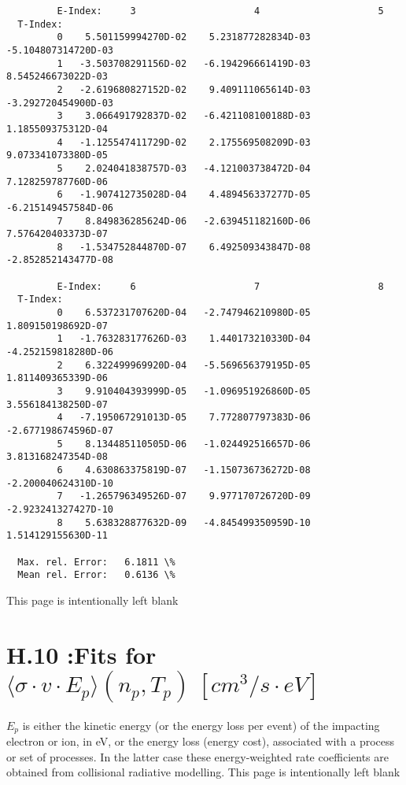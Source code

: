 \documentclass[12pt,dvipdfmx]{article}
\begin{document}
{\begin{small}
\begin{verbatim}
         E-Index:     3                     4                     5
  T-Index:
         0    5.501159994270D-02    5.231877282834D-03   -5.104807314720D-03
         1   -3.503708291156D-02   -6.194296661419D-03    8.545246673022D-03
         2   -2.619680827152D-02    9.409111065614D-03   -3.292720454900D-03
         3    3.066491792837D-02   -6.421108100188D-03    1.185509375312D-04
         4   -1.125547411729D-02    2.175569508209D-03    9.073341073380D-05
         5    2.024041838757D-03   -4.121003738472D-04    7.128259787760D-06
         6   -1.907412735028D-04    4.489456337277D-05   -6.215149457584D-06
         7    8.849836285624D-06   -2.639451182160D-06    7.576420403373D-07
         8   -1.534752844870D-07    6.492509343847D-08   -2.852852143477D-08

         E-Index:     6                     7                     8
  T-Index:
         0    6.537231707620D-04   -2.747946210980D-05    1.809150198692D-07
         1   -1.763283177626D-03    1.440173210330D-04   -4.252159818280D-06
         2    6.322499969920D-04   -5.569656379195D-05    1.811409365339D-06
         3    9.910404393999D-05   -1.096951926860D-05    3.556184138250D-07
         4   -7.195067291013D-05    7.772807797383D-06   -2.677198674596D-07
         5    8.134485110505D-06   -1.024492516657D-06    3.813168247354D-08
         6    4.630863375819D-07   -1.150736736272D-08   -2.200040624310D-10
         7   -1.265796349526D-07    9.977170726720D-09   -2.923241327427D-10
         8    5.638328877632D-09   -4.845499350959D-10    1.514129155630D-11

  Max. rel. Error:   6.1811 \%
  Mean rel. Error:   0.6136 \%

\end{verbatim}\end{small}



\newpage
This page is intentionally left blank
\newpage
\section{H.10 :Fits for $\langle\sigma \cdot v \cdot E_p \rangle (n_p,T_p) \
[cm^3/s \cdot eV]$}

$E_p$ is either the kinetic energy (or the energy loss per event) of the impacting electron or ion, in eV, or the
energy loss (energy cost), associated with a process or set of processes.
In the latter case these energy-weighted rate coefficients are obtained from
collisional radiative modelling.
\newpage
This page is intentionally left blank
\newpage

}
\end{document}

